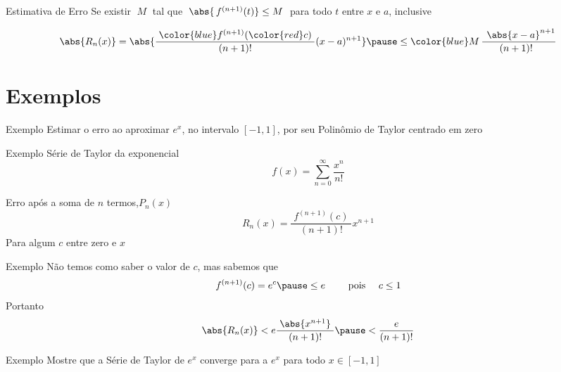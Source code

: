\begin{frame}{Estimativa de Erro}
Se existir \(\;M\;\) tal que  \emph{\(\;\abs{\,f^{(n+1)}(t)} \leq M \;\)}
para todo \(t\) entre \(x\) e \(a\), inclusive

\pause
\vspace{\baselineskip}
\[
  \abs{R_n(x)}
  = \abs{\frac{\;{\color{blue}f^{(n+1)}({\color{red}c})}\;}{(n+1)!}(x-a)^{n+1}} \pause
  \leq {\color{blue} M}\, \frac{\;\,\abs{x-a}^{n+1}}{(n+1)!\;\;}
\]
\end{frame}

\section{Exemplos}

\addtocounter{exemplo}{1}
\begin{frame}{Exemplo \theexemplo}
  Estimar o erro ao aproximar \(e^x\), no intervalo \([-1, 1]\),
  por seu Polinômio de Taylor centrado em zero
\end{frame}

\begin{frame}{Exemplo \theexemplo}
  Série de Taylor da exponencial
  \[
    f(x) = \sum_{n=0}^\infty \frac{x^n}{n!}
  \]

  \pause
  Erro após a soma de $n$ termos,\(P_n(x)\)
  \[
    R_n(x)=\frac{\;f^{(n+1)}(c)\;}{(n+1)!}x^{n+1}
  \]
  Para algum $c$ entre zero e $x$
\end{frame}

\begin{frame}{Exemplo \theexemplo}
  Não temos como saber o valor de $c$\pause, mas sabemos que
  \[
    f^{(n+1)}(c) = e^c \pause \leq e
    \qquad\text{ pois } \quad c \leq 1
  \]
  \pause
  Portanto
  \[
    \abs{R_n(x)} < e\frac{\;\abs{x^{n+1}}\;}{(n+1)!} \pause
                 < \frac{\;e\;}{(n+1)!}
  \]
\end{frame}

\addtocounter{exemplo}{1}
\begin{frame}{Exemplo \theexemplo}
  Mostre que a Série de Taylor de \(e^x\) converge para a \(e^x\) para todo
  \(x\in[-1, 1]\)
\end{frame}

